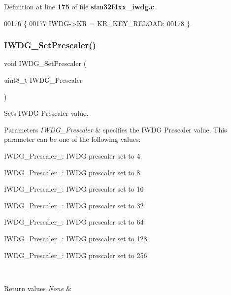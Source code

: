Definition at line \textbf{ 175} of file \textbf{ stm32f4xx\+\_\+iwdg.\+c}.


\begin{DoxyCode}
00176 \{
00177   IWDG->KR = KR_KEY_RELOAD;
00178 \}
\end{DoxyCode}
\mbox{\label{group__IWDG_ga4fa7f1cd690533a35ad9e4729c0450a3}} 
\subsubsection{I\+W\+D\+G\+\_\+\+Set\+Prescaler()}
{\footnotesize\ttfamily void I\+W\+D\+G\+\_\+\+Set\+Prescaler (\begin{DoxyParamCaption}\item[{uint8\+\_\+t}]{I\+W\+D\+G\+\_\+\+Prescaler }\end{DoxyParamCaption})}



Sets I\+W\+DG Prescaler value. 


\begin{DoxyParams}{Parameters}
{\em I\+W\+D\+G\+\_\+\+Prescaler} & specifies the I\+W\+DG Prescaler value. This parameter can be one of the following values\+: \begin{DoxyItemize}
\item I\+W\+D\+G\+\_\+\+Prescaler\+\_\+: I\+W\+DG prescaler set to 4 \item I\+W\+D\+G\+\_\+\+Prescaler\+\_\+: I\+W\+DG prescaler set to 8 \item I\+W\+D\+G\+\_\+\+Prescaler\+\_\+: I\+W\+DG prescaler set to 16 \item I\+W\+D\+G\+\_\+\+Prescaler\+\_\+: I\+W\+DG prescaler set to 32 \item I\+W\+D\+G\+\_\+\+Prescaler\+\_\+: I\+W\+DG prescaler set to 64 \item I\+W\+D\+G\+\_\+\+Prescaler\+\_\+: I\+W\+DG prescaler set to 128 \item I\+W\+D\+G\+\_\+\+Prescaler\+\_\+: I\+W\+DG prescaler set to 256 \end{DoxyItemize}
\\
\hline
\end{DoxyParams}

\begin{DoxyRetVals}{Return values}
{\em None} & \\
\hline
\end{DoxyRetVals}


